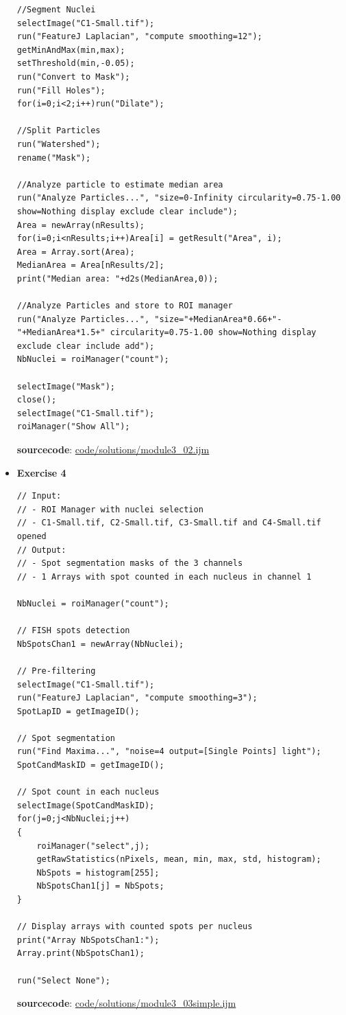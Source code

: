 \documentclass[11pt,a4paper,oneside]{report}
\begin{document}
\begin{itemize}
\begin{lstlisting}
//Segment Nuclei
selectImage("C1-Small.tif");
run("FeatureJ Laplacian", "compute smoothing=12");
getMinAndMax(min,max);
setThreshold(min,-0.05);
run("Convert to Mask");
run("Fill Holes");
for(i=0;i<2;i++)run("Dilate");

//Split Particles
run("Watershed");
rename("Mask");

//Analyze particle to estimate median area
run("Analyze Particles...", "size=0-Infinity circularity=0.75-1.00 show=Nothing display exclude clear include"); 
Area = newArray(nResults);
for(i=0;i<nResults;i++)Area[i] = getResult("Area", i);
Area = Array.sort(Area);
MedianArea = Area[nResults/2];
print("Median area: "+d2s(MedianArea,0));

//Analyze Particles and store to ROI manager
run("Analyze Particles...", "size="+MedianArea*0.66+"-"+MedianArea*1.5+" circularity=0.75-1.00 show=Nothing display exclude clear include add");
NbNuclei = roiManager("count");

selectImage("Mask");
close();
selectImage("C1-Small.tif");
roiManager("Show All");
\end{lstlisting}
\textbf{sourcecode}: \href{http://www.example.com/contents}{code/solutions/module3\_02.ijm}
\item \textbf{Exercise 4}

\begin{lstlisting}
// Input: 
// - ROI Manager with nuclei selection
// - C1-Small.tif, C2-Small.tif, C3-Small.tif and C4-Small.tif opened
// Output: 
// - Spot segmentation masks of the 3 channels
// - 1 Arrays with spot counted in each nucleus in channel 1

NbNuclei = roiManager("count");

// FISH spots detection
NbSpotsChan1 = newArray(NbNuclei);

// Pre-filtering
selectImage("C1-Small.tif");
run("FeatureJ Laplacian", "compute smoothing=3");
SpotLapID = getImageID();
	
// Spot segmentation
run("Find Maxima...", "noise=4 output=[Single Points] light");
SpotCandMaskID = getImageID();
	
// Spot count in each nucleus
selectImage(SpotCandMaskID);
for(j=0;j<NbNuclei;j++)
{ 	
	roiManager("select",j);
	getRawStatistics(nPixels, mean, min, max, std, histogram);
	NbSpots = histogram[255];
	NbSpotsChan1[j] = NbSpots;
}

// Display arrays with counted spots per nucleus
print("Array NbSpotsChan1:");
Array.print(NbSpotsChan1);

run("Select None");
\end{lstlisting}
\textbf{sourcecode}: \href{http://www.example.com/contents}{code/solutions/module3\_03simple.ijm}


\end{itemize}
\end{document}

